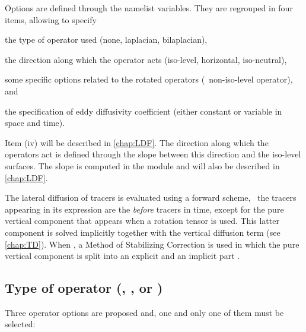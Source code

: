 \documentclass[../main/NEMO_manual]{subfiles}
\begin{document}
\begin{listing}
  \caption{}
  \label{lst:namtra_ldf}
\end{listing}

Options are defined through the  namelist variables.
They are regrouped in four items, allowing to specify
\begin{enumerate*}[label=(\textit{\roman*})]
\item the type of operator used (none, laplacian, bilaplacian),
\item the direction along which the operator acts (iso-level, horizontal, iso-neutral),
\item some specific options related to the rotated operators (\ie\ non-iso-level operator), and
\item the specification of eddy diffusivity coefficient
  (either constant or variable in space and time).
\end{enumerate*}
Item (iv) will be described in \autoref{chap:LDF}.
The direction along which the operators act is defined through the slope between
this direction and the iso-level surfaces.
The slope is computed in the  module and will also be described in \autoref{chap:LDF}.

The lateral diffusion of tracers is evaluated using a forward scheme,
\ie\ the tracers appearing in its expression are the \textit{before} tracers in time,
except for the pure vertical component that appears when a rotation tensor is used.
This latter component is solved implicitly together with the vertical diffusion term
(see \autoref{chap:TD}).
When ,
a Method of Stabilizing Correction is used in which the pure vertical component is split into
an explicit and an implicit part \citep{lemarie.debreu.ea_OM12}.

\subsection[Type of operator (\forcode{ln_traldf_}\{\forcode{OFF,lap,blp}\})]{Type of operator (\protect{}, \protect{}, or \protect{})}
\label{subsec:TRA_ldf_op}

Three operator options are proposed and, one and only one of them must be selected:
\end{document}
